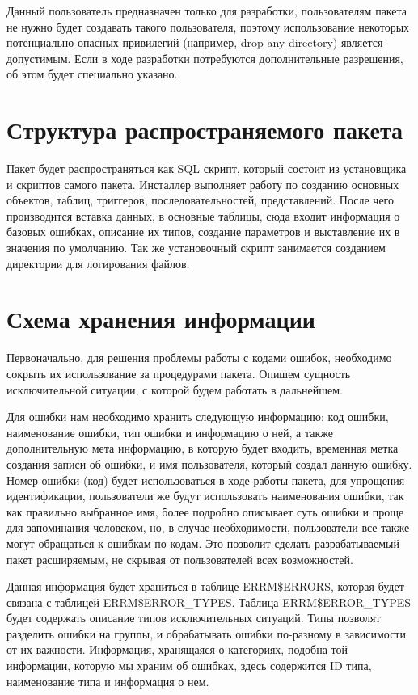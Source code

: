 Данный пользователь предназначен только для разработки, пользователям пакета не нужно будет создавать такого пользователя, поэтому использование некоторых потенциально опасных привилегий (например, drop any directory) является допустимым. Если в ходе разработки потребуются дополнительные разрешения, об этом будет специально указано.


\section{Структура распространяемого пакета} \label{ch3:sec2}

Пакет будет распространяться как SQL скрипт, который состоит из установщика и скриптов самого пакета. Инсталлер выполняет работу по созданию основных объектов, таблиц, триггеров, последовательностей, представлений. После чего производится вставка данных, в основные таблицы, сюда входит информация о базовых ошибках, описание их типов, создание параметров и выставление их в значения по умолчанию. Так же установочный скрипт занимается созданием директории для логирования файлов.


\section{Схема хранения информации} \label{ch3:sec3}

Первоначально, для решения проблемы работы с кодами ошибок, необходимо сокрыть их использование за процедурами пакета. Опишем сущность исключительной ситуации, с которой будем работать в дальнейшем. 

Для ошибки нам необходимо хранить следующую информацию: код ошибки, наименование ошибки, тип ошибки и информацию о ней, а также дополнительную мета информацию, в которую будет входить, временная метка создания записи об ошибки, и имя пользователя, который создал данную ошибку. Номер ошибки (код) будет использоваться в ходе работы пакета, для упрощения идентификации, пользователи же будут использовать наименования ошибки, так как правильно выбранное имя, более подробно описывает суть ошибки и проще для запоминания человеком, но, в случае необходимости, пользователи все также могут обращаться к ошибкам по кодам. Это позволит сделать разрабатываемый пакет расширяемым, не скрывая от пользователей всех возможностей. 

Данная информация будет храниться в таблице ERRM\$ERRORS, которая будет связана с таблицей ERRM\$ERROR\_TYPES. Таблица ERRM\$ERROR\_TYPES будет содержать описание типов исключительных ситуаций. Типы позволят разделить ошибки на группы, и обрабатывать ошибки по-разному в зависимости от их важности. Информация, хранящаяся о категориях, подобна той информации, которую мы храним об ошибках, здесь содержится ID типа, наименование типа и информация о нем. 

